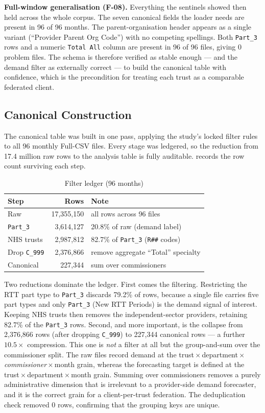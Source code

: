 \documentclass[11pt,a4paper]{article}
\begin{document}
\textbf{Full-window generalisation (F-08).} Everything the sentinels showed then held across the whole corpus. The seven canonical fields the loader needs are present in 96 of 96 months. The parent-organisation header appears as a single variant (``Provider Parent Org Code'') with no competing spellings. Both \texttt{Part\_3} rows and a numeric \texttt{Total All} column are present in 96 of 96 files, giving 0 problem files. The schema is therefore verified as stable enough --- and the demand filter as externally correct --- to build the canonical table with confidence, which is the precondition for treating each trust as a comparable federated client.

\subsection{Canonical Construction}\label{sec:canon}

The canonical table was built in one pass, applying the study's locked filter rules to all 96 monthly Full-CSV files. Every stage was ledgered, so the reduction from 17.4 million raw rows to the analysis table is fully auditable.  records the row count surviving each step.

\begin{table}[H]
\centering
\caption{Filter ledger (96 months)}\label{tab:ledger}
\begin{tabular}{lrl}
\toprule
Step & Rows & Note \\
\midrule
Raw & 17,355,150 & all rows across 96 files \\
\texttt{Part\_3} & 3,614,127 & 20.8\% of raw (demand label) \\
NHS trusts & 2,987,812 & 82.7\% of \texttt{Part\_3} (\texttt{R\#\#} codes) \\
Drop \texttt{C\_999} & 2,376,866 & remove aggregate ``Total'' specialty \\
Canonical & 227,344 & sum over commissioners \\
\bottomrule
\end{tabular}
\end{table}

Two reductions dominate the ledger. First comes the filtering. Restricting the RTT part type to \texttt{Part\_3} discards 79.2\% of rows, because a single file carries five part types and only \texttt{Part\_3} (New RTT Periods) is the demand signal of interest. Keeping NHS trusts then removes the independent-sector providers, retaining 82.7\% of the \texttt{Part\_3} rows. Second, and more important, is the collapse from 2,376,866 rows (after dropping \texttt{C\_999}) to 227,344 canonical rows --- a further $10.5\times$ compression. This one is \emph{not} a filter at all but the group-and-sum over the commissioner split. The raw files record demand at the trust\,$\times$\,department\,$\times$\,\emph{commissioner}\,$\times$\,month grain, whereas the forecasting target is defined at the trust\,$\times$\,department\,$\times$\,month grain. Summing over commissioners removes a purely administrative dimension that is irrelevant to a provider-side demand forecaster, and it is the correct grain for a client-per-trust federation. The deduplication check removed 0 rows, confirming that the grouping keys are unique.
\end{document}
